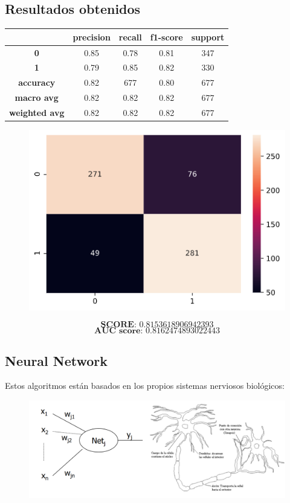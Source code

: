 \documentclass[11pt,a4paper]{article}
\begin{document}
\subsection*{Resultados obtenidos}
\begin{table}[H]
    \centering
    \begin{tabular}{c|cccc}
        \textbf{} & \textbf{precision} & \textbf{recall} & \textbf{f1-score} & \textbf{support} \\ \hline
        \textbf{0} & 0.85 & 0.78 & 0.81 & 347 \\
        \textbf{1} & 0.79 & 0.85 & 0.82 & 330 \\ \hline
        \textbf{accuracy} & 0.82 & 677 & 0.80 & 677 \\
        \textbf{macro avg} & 0.82 & 0.82 & 0.82 & 677 \\
        \textbf{weighted avg} & 0.82 & 0.82 & 0.82 & 677
    \end{tabular}
\end{table}

\begin{figure}[H]
    \centering
    \includegraphics[scale=0.5]{img/matrix-naivebayes.png}    
\end{figure}
$$\textbf{SCORE:  } 0.8153618906942393$$
$$\textbf{AUC score:  } 0.8162474893022443$$


\subsection{Neural Network}
Estos algoritmos están basados en los propios sistemas nerviosos biológicos:
\begin{figure}[H]
    \centering
    \includegraphics[scale=0.35]{img/neural-network.png}    
\end{figure}
\end{document}
